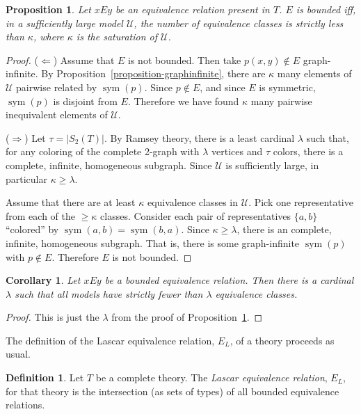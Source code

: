 \documentclass[letterpaper,twoside]{article}
\newtheorem{proposition}[theorem]{Proposition}
\newtheorem{corollary}{Corollary}[theorem]
\theoremstyle{definition}
\newtheorem{definition}[theorem]{Definition}
\theoremstyle{remark}
\newcommand{\defterm}[1]{\emph{#1}}
\DeclareMathOperator{\sym}{sym}
\begin{document}
\begin{proposition}\label{proposition-boundedasusual}
  Let \(xEy\) be an equivalence relation present in \(T\).  \(E\) is
  bounded iff, in a sufficiently large model \(\mathcal{U}\), the
  number of equivalence classes is strictly less than \(\kappa\),
  where \(\kappa\) is the saturation of \(\mathcal{U}\).
\end{proposition}
\begin{proof}
  (\(\Leftarrow\)) Assume that \(E\) is not bounded.  Then take
  \(p(x,y) \notin E\) graph-infinite.  By
  Proposition~\ref{proposition-graphinfinite}, there are \(\kappa\)
  many elements of \(\mathcal{U}\) pairwise related by \(\sym(p)\).
  Since \(p \notin E\), and since \(E\) is symmetric, \(\sym(p)\) is
  disjoint from \(E\).  Therefore we have found \(\kappa\) many
  pairwise inequivalent elements of \(\mathcal{U}\).

  (\(\Rightarrow\)) Let \(\tau = |S_2(T)|\).  By Ramsey theory, there
  is a least cardinal \(\lambda\) such that, for any coloring of the
  complete 2-graph with \(\lambda\) vertices and \(\tau\) colors,
  there is a complete, infinite, homogeneous subgraph.  Since
  \(\mathcal{U}\) is sufficiently large, in particular \(\kappa \geq
  \lambda\).

  Assume that there are at least \(\kappa\) equivalence classes in
  \(\mathcal{U}\).  Pick one representative from each of the \(\geq
  \kappa\) classes.  Consider each pair of representatives \(\{a,b\}\)
  ``colored'' by \(\sym(a,b) = \sym(b,a)\).  Since \(\kappa \geq
  \lambda\), there is an complete, infinite, homogeneous subgraph.
  That is, there is some graph-infinite \(\sym(p)\) with \(p \notin
  E\).  Therefore \(E\) is not bounded.
\end{proof}

\begin{corollary}\label{corollary-uniformboundonclasses}
  Let \(xEy\) be a bounded equivalence relation.  Then there is a
  cardinal \(\lambda\) such that all models have strictly fewer than
  \(\lambda\) equivalence classes.
\end{corollary}
\begin{proof}
  This is just the \(\lambda\) from the proof of
  Proposition~\ref{proposition-boundedasusual}.
\end{proof}

The definition of the Lascar equivalence relation, \(E_L\), of a
theory proceeds as usual.

\begin{definition}\label{definition-lascarequivalence}
  Let \(T\) be a complete theory.  The \defterm{Lascar equivalence
    relation}, \(E_L\), for that theory is the intersection (as sets
  of types) of all bounded equivalence relations.
\end{definition}
\end{document}
